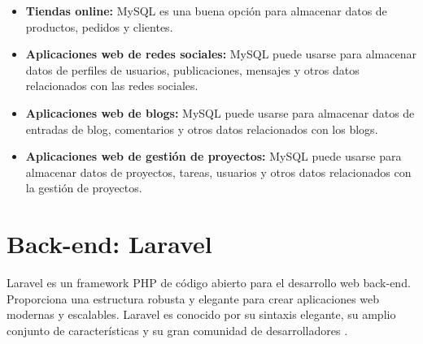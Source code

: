 \begin{itemize}
    \begin{itemize}

    \item \textbf{Tiendas online:} MySQL es una buena opción para almacenar datos de productos, pedidos y clientes.

    \item \textbf{Aplicaciones web de redes sociales:} MySQL puede usarse para almacenar datos de perfiles de usuarios, publicaciones, mensajes y otros datos relacionados con las redes sociales.

    \item \textbf{Aplicaciones web de blogs:} MySQL puede usarse para almacenar datos de entradas de blog, comentarios y otros datos relacionados con los blogs.

    \item \textbf{Aplicaciones web de gestión de proyectos:} MySQL puede usarse para almacenar datos de proyectos, tareas, usuarios y otros datos relacionados con la gestión de proyectos.

    \end{itemize}
\end{itemize}
\section{Back-end: Laravel}\label{sec:sec3.2}

Laravel es un framework PHP de código abierto para el desarrollo web back-end. Proporciona una estructura robusta y elegante para crear aplicaciones web modernas y escalables. Laravel es conocido por su sintaxis elegante, su amplio conjunto de características y su gran comunidad de desarrolladores \cite{laravel, stauffer}.

\vspace{0.5cm}

